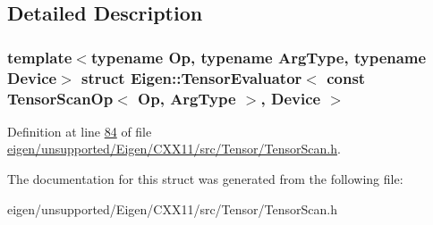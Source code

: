 \subsection{Detailed Description}
\subsubsection*{template$<$typename Op, typename Arg\+Type, typename Device$>$\newline
struct Eigen\+::\+Tensor\+Evaluator$<$ const Tensor\+Scan\+Op$<$ Op, Arg\+Type $>$, Device $>$}



Definition at line \hyperlink{eigen_2unsupported_2_eigen_2_c_x_x11_2src_2_tensor_2_tensor_scan_8h_source_l00084}{84} of file \hyperlink{eigen_2unsupported_2_eigen_2_c_x_x11_2src_2_tensor_2_tensor_scan_8h_source}{eigen/unsupported/\+Eigen/\+C\+X\+X11/src/\+Tensor/\+Tensor\+Scan.\+h}.



The documentation for this struct was generated from the following file\+:\begin{DoxyCompactItemize}
\item 
eigen/unsupported/\+Eigen/\+C\+X\+X11/src/\+Tensor/\+Tensor\+Scan.\+h\end{DoxyCompactItemize}
